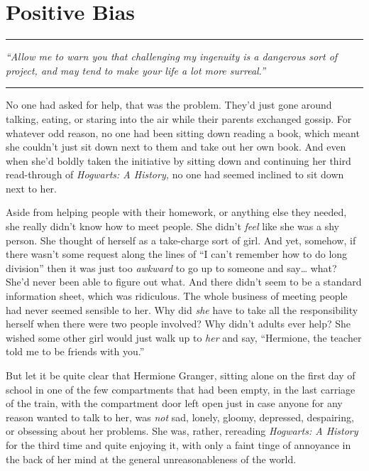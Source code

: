 \chapter{Positive Bias}\label{positive-bias}

\begin{center}\rule{3in}{0.4pt}\end{center}

\emph{``Allow me to warn you that challenging my ingenuity is a
dangerous sort of project, and may tend to make your life a lot more
surreal.''}

\begin{center}\rule{3in}{0.4pt}\end{center}

No one had asked for help, that was the problem. They'd just gone around
talking, eating, or staring into the air while their parents exchanged
gossip. For whatever odd reason, no one had been sitting down reading a
book, which meant she couldn't just sit down next to them and take out
her own book. And even when she'd boldly taken the initiative by sitting
down and continuing her third read-through of \emph{Hogwarts: A
History,} no one had seemed inclined to sit down next to her.

Aside from helping people with their homework, or anything else they
needed, she really didn't know how to meet people. She didn't
\emph{feel} like she was a shy person. She thought of herself as a
take-charge sort of girl. And yet, somehow, if there wasn't some request
along the lines of ``I can't remember how to do long division'' then it
was just too \emph{awkward} to go up to someone and say\ldots{} what?
She'd never been able to figure out what. And there didn't seem to be a
standard information sheet, which was ridiculous. The whole business of
meeting people had never seemed sensible to her. Why did \emph{she} have
to take all the responsibility herself when there were two people
involved? Why didn't adults ever help? She wished some other girl would
just walk up to \emph{her} and say, ``Hermione, the teacher told me to
be friends with you.''

But let it be quite clear that Hermione Granger, sitting alone on the
first day of school in one of the few compartments that had been empty,
in the last carriage of the train, with the compartment door left open
just in case anyone for any reason wanted to talk to her, was \emph{not}
sad, lonely, gloomy, depressed, despairing, or obsessing about her
problems. She was, rather, rereading \emph{Hogwarts: A History} for the
third time and quite enjoying it, with only a faint tinge of annoyance
in the back of her mind at the general unreasonableness of the world.

